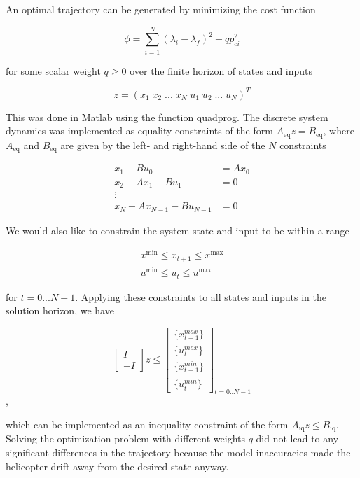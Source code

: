 An optimal trajectory can be generated by minimizing the cost function

\begin{equation}
	\label{eq:trajectory_cost}
	\phi = \sum_{i=1}^{N}(\lambda_i - \lambda_f)^2 + qp_{ci}^2
\end{equation}

for some scalar weight $q \geq 0$ over the finite horizon of states and inputs

\begin{equation}
	z = (x_1 \; x_2 \; ... \; x_N \; u_1 \; u_2 \; ... \; u_N)^T
\end{equation}

This was done in Matlab using the function quadprog. The discrete system dynamics was implemented as equality constraints of the form $A_{\text{eq}}z = B_{\text{eq}}$, where $A_{\text{eq}}$ and $B_{\text{eq}}$ are given by the left- and right-hand side of the $N$ constraints

\begin{align*}
	x_1 - Bu_0        &= Ax_0 \\
	x_2 - Ax_1 - Bu_1 &= 0    \\
	\vdots                    \\
	x_N - Ax_{N-1} - Bu_{N-1} &= 0
\end{align*}

We would also like to constrain the system state and input to be within a range

\begin{align}
	x^{\text{min}} \leq x_{t+1} \leq x^{\text{max}} \\
	u^{\text{min}} \leq u_t \leq u^{\text{max}}
\end{align}

for $t = 0...N-1$. Applying these constraints to all states and inputs in the solution horizon, we have

\begin{equation}
	\begin{bmatrix} I \\ -I \end{bmatrix} z
	\leq
	\begin{bmatrix}
	\{x_{t+1}^{max}\} \\
	\{u_t^{max}\} \\
	\{x_{t+1}^{min}\} \\
	\{u_t^{min}\}
	\end{bmatrix}_{t=0..N-1}
\end{equation},

which can be implemented as an inequality constraint of the form $A_{\text{iq}} z \leq B_{\text{iq}}$. Solving the optimization problem with different weights $q$ did not lead to any significant differences in the trajectory because the model inaccuracies made the helicopter drift away from the desired state anyway.

